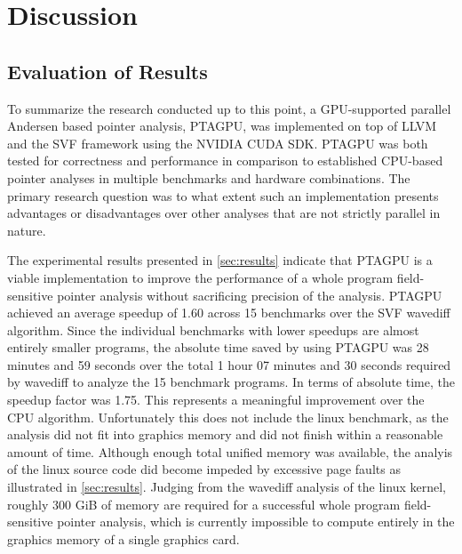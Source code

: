 \chapter{Discussion}\label{chap:conclusion}

\section{Evaluation of Results}
To summarize the research conducted up to this point, a GPU-supported parallel Andersen based pointer analysis, PTAGPU, was implemented on top of LLVM and the SVF framework using the NVIDIA CUDA SDK.
PTAGPU was both tested for correctness and performance in comparison to established CPU-based pointer analyses in multiple benchmarks and hardware combinations.
The primary research question was to what extent such an implementation presents advantages or disadvantages over other analyses that are not strictly parallel in nature.

The experimental results presented in \autoref{sec:results} indicate that PTAGPU is a viable implementation to improve the performance of a whole program field-sensitive pointer analysis without sacrificing precision of the analysis.
PTAGPU achieved an average speedup of 1.60 across 15 benchmarks over the SVF wavediff algorithm. Since the individual benchmarks with lower speedups are almost entirely smaller programs, the absolute time saved by using PTAGPU was 28 minutes and 59 seconds over the total 1 hour 07 minutes and 30 seconds required by wavediff to analyze the 15 benchmark programs. In terms of absolute time, the speedup factor was 1.75.
This represents a meaningful improvement over the CPU algorithm. 
Unfortunately this does not include the linux benchmark, as the analysis did not fit into graphics memory and did not finish within a reasonable amount of time.
Although enough total unified memory was available, the analyis of the linux source code did become impeded by excessive page faults as illustrated in \autoref{sec:results}.
Judging from the wavediff analysis of the linux kernel, roughly 300 GiB of memory are required for a successful whole program field-sensitive pointer analysis, which is currently impossible to compute entirely in the graphics memory of a single graphics card.

